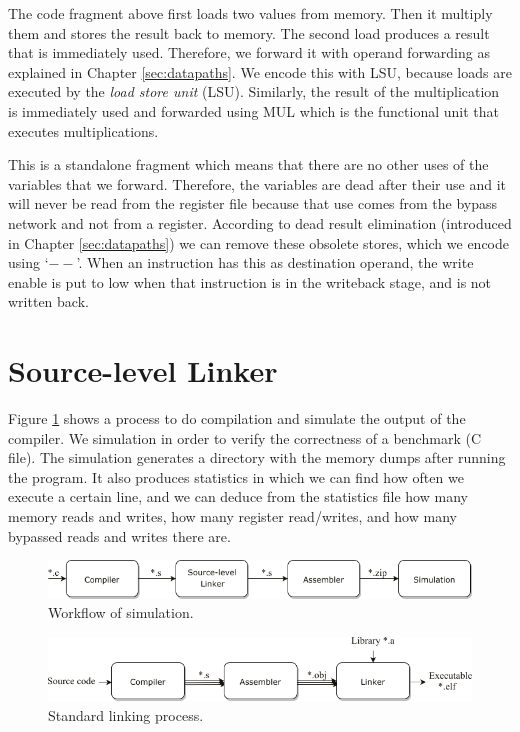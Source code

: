 The code fragment above first loads two values from memory. Then it multiply them and stores the result back to memory. The second load produces a result that is immediately used. Therefore, we forward it with operand forwarding as explained in Chapter \ref{sec:datapaths}. We encode this with LSU, because loads are executed by the \emph{load store unit} (LSU). Similarly, the result of the multiplication is immediately used and forwarded using MUL which is the functional unit that executes  multiplications.

This is a standalone fragment which means that there are no other uses of the variables that we forward. Therefore, the variables are dead after their use and it will never be read from the register file because that use comes from the bypass network and not from a register. According to dead result elimination (introduced in Chapter \ref{sec:datapaths}) we can remove these obsolete stores, which we encode using `$--$'. When an instruction has this as destination operand, the write enable is put to low when that instruction is in the writeback stage, and is not written back. 


\section{Source-level Linker}
Figure \ref{fig:linker_A} shows a process to do compilation and simulate the output of the compiler. We simulation in order to verify the correctness of a benchmark (C file). The simulation generates a directory with the memory dumps after running the program. It also produces statistics in which we can find how often we execute a certain line, and we can deduce from the statistics file how many memory reads and writes, how many register read/writes, and how many bypassed reads and writes there are. \\

\begin{figure}[H]
\centering
\includegraphics[width=.95\textwidth]{figures/linker_illustration1}
\caption{Workflow of simulation.}
\label{fig:linker_A}
\end{figure}
\begin{figure}[b]
\centering
\includegraphics[width=.9\textwidth]{figures/linker_illustration2}
\caption{Standard linking process.}
\label{fig:linker_B}
\end{figure}

